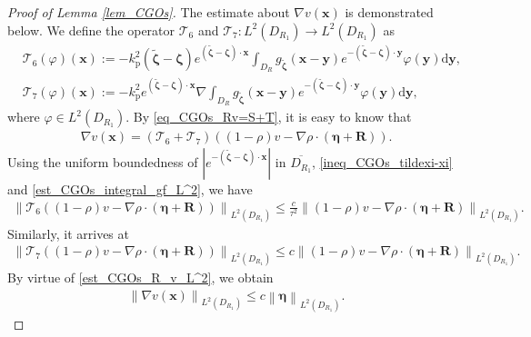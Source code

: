 \documentclass[11pt,reqno,oneside]{amsart}
\theoremstyle{definition}
\theoremstyle{remark}
\numberwithin{equation}{section}
\numberwithin{equation}{section}
\theoremstyle{remark}
\begin{document}
\begin{proof}[Proof of Lemma \ref{lem_CGOs}]
	
	The estimate about $ \nabla v\left(\mathbf{x}\right) $ is demonstrated below. We define the operator $ \mathcal{T}_6 $ and $ \mathcal{T}_7 : L^2\left(D_{R_1}\right)\to L^2\left(D_{R_1}\right) $ as
	\begin{align*}
		&\mathcal{T}_6\left(\varphi\right)\left(\mathbf{x}\right) := - k_{\mathrm{p}}^2 \left(\tilde{\bm{\zeta}}-\bm{\zeta}\right) e^{\left(\tilde{\bm{\zeta}}-\bm{\zeta}\right) \cdot \mathbf{x}} \int_{D_R} g_{\tilde{\bm{\zeta}}}\left(\mathbf{x} - \mathbf{y}\right) e^{-\left(\tilde{\bm{\zeta}}-\bm{\zeta}\right) \cdot \mathbf{y}} \varphi\left(\mathbf{y}\right) \mathrm{d} \mathbf{y}, \\
		&\mathcal{T}_7\left(\varphi\right)\left(\mathbf{x}\right) := - k_{\mathrm{p}}^2 e^{\left(\tilde{\bm{\zeta}}-\bm{\zeta}\right) \cdot \mathbf{x}} \nabla \int_{D_R} g_{\tilde{\bm{\zeta}}}\left(\mathbf{x} - \mathbf{y}\right) e^{-\left(\tilde{\bm{\zeta}}-\bm{\zeta}\right) \cdot \mathbf{y}} \varphi\left(\mathbf{y}\right) \mathrm{d} \mathbf{y},
	\end{align*}
	where $ \varphi \in L^2 \left(D_{R_1}\right) $. By \eqref{eq_CGOs_Rv=S+T}, it is easy to know that 
	\begin{align*}
		\nabla v\left(\mathbf{x}\right) = \left(\mathcal{T}_6 + \mathcal{T}_7\right) \left(\left(1-\rho\right) v - \nabla \rho \cdot \left(\bm{\eta}+\mathbf{R}\right)\right).
	\end{align*}
	Using the uniform boundedness of $ \left| e^{-\left(\tilde{\bm{\zeta}}-\bm{\zeta}\right) \cdot \mathbf{x}} \right| $ in $ \overline{D_{R_1}} $, \eqref{ineq_CGOs_tildexi-xi} and \eqref{est_CGOs_integral_gf_L^2}, we have
	\begin{align*} 
		\left\| \mathcal{T}_6 \left(\left(1-\rho\right) v - \nabla \rho \cdot \left(\bm{\eta}+\mathbf{R}\right)\right) \right\|_{L^2\left(D_{R_1}\right)} \leqslant \frac{c}{\tau^2} \left\| \left(1-\rho\right) v - \nabla \rho \cdot \left(\bm{\eta}+\mathbf{R}\right) \right\|_{L^2\left(D_{R_1}\right)} .
	\end{align*}
	Similarly, it arrives at
	\begin{align*} 
		\left\| \mathcal{T}_7 \left(\left(1-\rho\right) v - \nabla \rho \cdot \left(\bm{\eta}+\mathbf{R}\right)\right) \right\|_{L^2\left(D_{R_1}\right)} \leqslant c \left\| \left(1-\rho\right) v - \nabla \rho \cdot \left(\bm{\eta}+\mathbf{R}\right) \right\|_{L^2\left(D_{R_1}\right)} .
	\end{align*}
	By virtue of \eqref{est_CGOs_R_v_L^2}, we obtain 
	\begin{align} \label{est_CGOs_gradientv_L^2}
		\left\| \nabla v\left(\mathbf{x}\right) \right\|_{L^2\left(D_{R_1}\right)} \leqslant c \left\| \bm{\eta} \right\|_{L^2\left(D_{R_1}\right)}.
	\end{align}
	

\end{proof}
\end{document}
